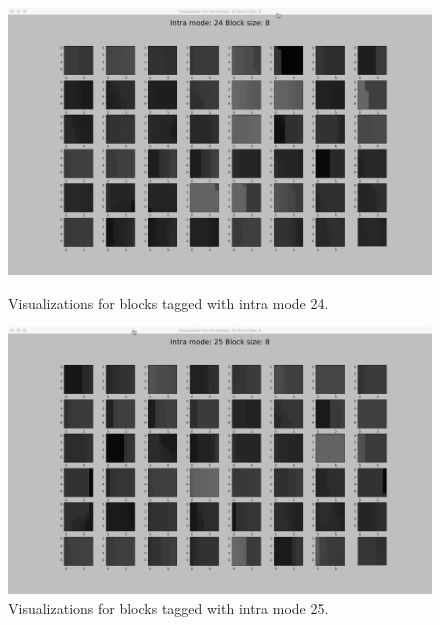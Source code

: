 \begin{figure}
        \vspace*{1cm} %
    
        \begin{minipage}{0.49\textwidth}
            \includegraphics[width=\linewidth]{Figures/visu-size8x8/8-24}
            \caption[Visualizations for blocks tagged with intra mode 24]{Visualizations for blocks tagged with intra mode 24.}
            \label{fig:size8_mode24}
        \end{minipage}
        \hspace{\fill} %
        \begin{minipage}{0.49\textwidth}
            \includegraphics[width=\linewidth]{Figures/visu-size8x8/8-25}
            \caption[Visualizations for blocks tagged with intra mode 25]{Visualizations for blocks tagged with intra mode 25.}
            \label{fig:size8_mode25}
        \end{minipage}
        

\end{figure}
